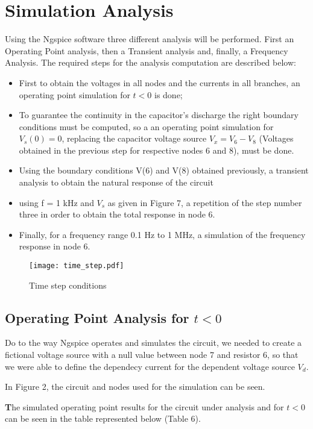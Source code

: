 \section{Simulation Analysis}
\label{sec:simulation}

Using the Ngspice software three different analysis will be performed. First an Operating Point analysis, then a Transient analysis and, finally, a Frequency Analysis. The required steps for the analysis computation are described below:

\begin{itemize}
	\item First to obtain the voltages in all nodes and the currents in all branches, an operating point simulation for $t<0$ is done;
	\item To guarantee the continuity in the capacitor's discharge the right boundary conditions must be computed, so a an operating point simulation for $V_s(0) = 0$, replacing the capacitor voltage source $V_x = V_6-V_8$ (Voltages obtained in the previous step for respective nodes 6 and 8), must be done.
	\item Using the boundary conditions V(6) and V(8) obtained previously, a transient analysis to obtain the natural response of the circuit
	\item using f = 1 kHz and {\it $V_s$} as given in Figure 7, a repetition of the step number three in order to obtain the total response in node 6.
	\item Finally, for a frequency range 0.1 Hz to 1 MHz, a simulation of the frequency response in node 6.
\end{itemize}
 
 \begin{figure}[H] \centering
\texttt{[image: time\_step.pdf]}
\caption{Time step conditions}
\label{fig:time_step}
\end{figure}

\subsection{Operating Point Analysis for $t<0$}
Do to the way Ngspice operates and simulates the circuit, we needed to create a fictional voltage source with a null value between node 7 and resistor 6, so that we were able to define the dependecy current for the dependent voltage source {\it $V_d$}.\par 
In Figure 2, the circuit and nodes used for the simulation can be seen.\par 
\textbf The simulated operating point results for the circuit under analysis and for $t<0$ can be seen in the table represented below (Table 6). 


